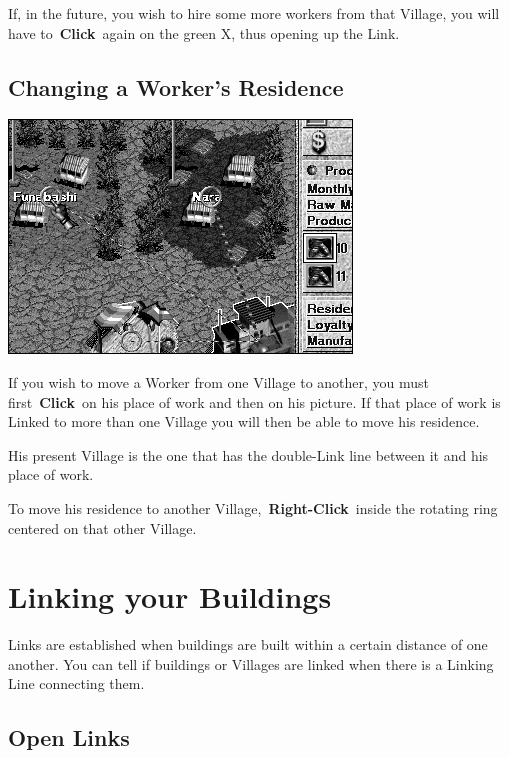 If, in the future, you wish to hire some more workers from that Village, you will have to \textbf{Click} again on the green X, thus opening up the Link.

\subsection{Changing a Worker’s Residence}

\begin{center}
	\includegraphics[width=0.7\linewidth]{Iresidencechange}
\end{center}

If you wish to move a Worker from one Village to another, you must first \textbf{Click} on his place of work and then on his picture. If that place of work is Linked to more than one Village you will then be able to move his residence.

His present Village is the one that has the double-Link line between it and his place of work.

To move his residence to another Village, \textbf{Right-Click} inside the rotating ring centered on that other Village.

\section{Linking your Buildings}


Links are established when buildings are built within a certain distance of one another. You can tell if buildings or Villages are linked when there is a Linking Line connecting them.

\clearpage

\subsection{Open Links}

